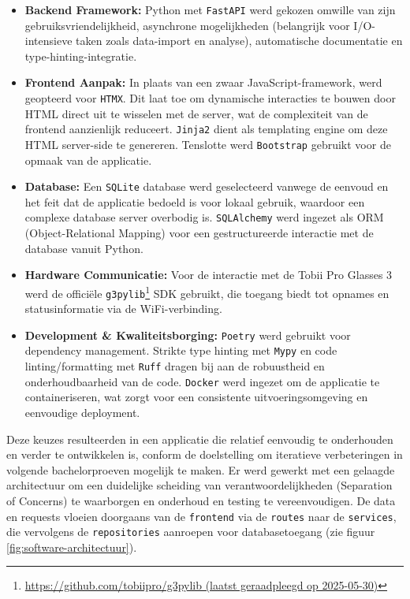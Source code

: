 \begin{itemize}
    \item \textbf{Backend Framework:} Python met \texttt{FastAPI} werd gekozen omwille van zijn gebruiksvriendelijkheid, asynchrone mogelijkheden (belangrijk voor I/O-in\-ten\-sieve taken zoals data-import en analyse), automatische documentatie en\\ type-hinting-integratie.
    \item \textbf{Frontend Aanpak:} In plaats van een zwaar JavaScript-framework, werd geopteerd voor \texttt{HTMX}. Dit laat toe om dynamische interacties te bouwen door HTML direct uit te wisselen met de server, wat de complexiteit van de frontend aanzienlijk reduceert. \texttt{Jinja2} dient als templating engine om deze HTML server-side te genereren. Tenslotte werd \texttt{Bootstrap} gebruikt voor de opmaak van de applicatie.
    \item \textbf{Database:} Een \texttt{SQLite} database werd geselecteerd vanwege de eenvoud en het feit dat de applicatie bedoeld is voor lokaal gebruik, waardoor een complexe database server overbodig is. \texttt{SQLAlchemy} werd ingezet als ORM (Object-Relational Mapping) voor een gestructureerde interactie met de database vanuit Python.
    \item \textbf{Hardware Communicatie:} Voor de interactie met de Tobii Pro Glasses 3 werd de officiële \texttt{g3pylib}\footnote{\url{https://github.com/tobiipro/g3pylib (laatst geraadpleegd op 2025-05-30)}} SDK gebruikt, die toegang biedt tot opnames en statusinformatie via de WiFi-verbinding.
    \item \textbf{Development \& Kwaliteitsborging:} \texttt{Poetry} werd gebruikt voor dependency management. Strikte type hinting met \texttt{Mypy} en code linting/formatting met \texttt{Ruff} dragen bij aan de robuustheid en onderhoudbaarheid van de code. \texttt{Docker} werd ingezet om de applicatie te containeriseren, wat zorgt voor een consistente uitvoeringsomgeving en eenvoudige deployment.
\end{itemize}

Deze keuzes resulteerden in een applicatie die relatief eenvoudig te onderhouden en verder te ontwikkelen is, conform de doelstelling om iteratieve verbeteringen in volgende bachelorproeven mogelijk te maken.
Er werd gewerkt met een gelaagde architectuur om een duidelijke scheiding van verantwoordelijkheden (Separation of Concerns) te waarborgen en onderhoud en testing te vereenvoudigen. 
De data en requests vloeien doorgaans van de \texttt{frontend} via de \texttt{routes} naar de \texttt{services}, die vervolgens de \texttt{repositories} aanroepen voor databasetoegang (zie figuur \ref{fig:software-architectuur}).

